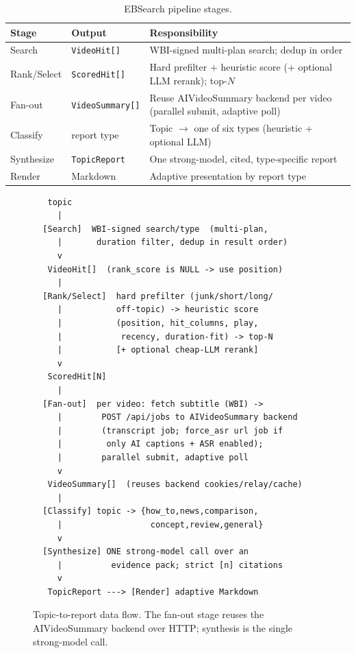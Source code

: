 \documentclass[conference]{IEEEtran}
\begin{document}
\begin{table}[t]
\centering
\caption{EBSearch pipeline stages.}
\label{tab:stages}
\footnotesize
\begin{tabular}{@{}llp{3.5cm}@{}}
\toprule
\textbf{Stage} & \textbf{Output} & \textbf{Responsibility} \\
\midrule
Search   & \texttt{VideoHit[]}  & WBI-signed multi-plan search; dedup in order \\
Rank/Select & \texttt{ScoredHit[]} & Hard prefilter + heuristic score (+ optional LLM rerank); top-$N$ \\
Fan-out  & \texttt{VideoSummary[]} & Reuse AIVideoSummary backend per video (parallel submit, adaptive poll) \\
Classify & report type          & Topic $\rightarrow$ one of six types (heuristic + optional LLM) \\
Synthesize & \texttt{TopicReport} & One strong-model, cited, type-specific report \\
Render   & Markdown             & Adaptive presentation by report type \\
\bottomrule
\end{tabular}
\end{table}

\begin{figure}[t]
\centering
\footnotesize
\begin{verbatim}
   topic
     |
  [Search]  WBI-signed search/type  (multi-plan,
     |       duration filter, dedup in result order)
     v
   VideoHit[]  (rank_score is NULL -> use position)
     |
  [Rank/Select]  hard prefilter (junk/short/long/
     |           off-topic) -> heuristic score
     |           (position, hit_columns, play,
     |            recency, duration-fit) -> top-N
     |           [+ optional cheap-LLM rerank]
     v
   ScoredHit[N]
     |
  [Fan-out]  per video: fetch subtitle (WBI) ->
     |        POST /api/jobs to AIVideoSummary backend
     |        (transcript job; force_asr url job if
     |         only AI captions + ASR enabled);
     |        parallel submit, adaptive poll
     v
   VideoSummary[]  (reuses backend cookies/relay/cache)
     |
  [Classify] topic -> {how_to,news,comparison,
     |                  concept,review,general}
     v
  [Synthesize] ONE strong-model call over an
     |          evidence pack; strict [n] citations
     v
   TopicReport ---> [Render] adaptive Markdown
\end{verbatim}
\caption{Topic-to-report data flow. The fan-out stage reuses the AIVideoSummary
backend over HTTP; synthesis is the single strong-model call.}
\label{fig:flow}
\end{figure}
\end{document}
